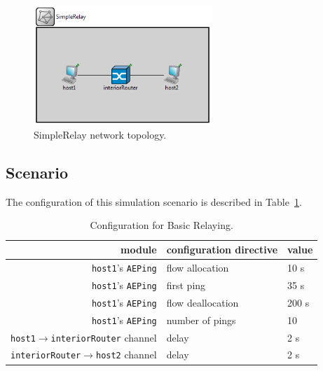             \begin{figure}[H]
                \begin{center}
                    \includegraphics[width=0.6\textwidth]{fig/examples-simplerelay.png}
                  \caption{SimpleRelay network topology.}
                  \label{fig:examples:simplerelay}
                \end{center}
            \end{figure}

        \subsection{Scenario}

            The configuration of this simulation scenario is described in Table~\ref{fig:examples:relaying:config}.

            \begin{table}[H]
                \begin{center}
                  \begin{tabular}{ | r | l | l | }
                    \hline
                    module & configuration directive & value \\
                    \hline
                    \texttt{host1}'s \texttt{AEPing} & flow allocation & 10 s \\
                    \texttt{host1}'s \texttt{AEPing} & first ping & 35 s \\
                    \texttt{host1}'s \texttt{AEPing} & flow deallocation & 200 s \\
                    \texttt{host1}'s \texttt{AEPing} & number of pings & 10 \\
                    \texttt{host1}$\rightarrow$\texttt{interiorRouter} channel & delay & 2 s \\
                    \texttt{interiorRouter}$\rightarrow$\texttt{host2} channel & delay & 2 s \\
                    \hline
                  \end{tabular}
                  \caption{Configuration for Basic Relaying.}
                  \label{fig:examples:relaying:config}
                \end{center}
            \end{table}

